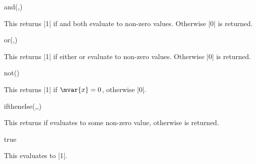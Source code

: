 \begin{math-function}{and(,)}
\mathcommand

	This returns |1| if  and  both evaluate to
	non-zero values. Otherwise |0| is returned.
	
\begin{codeexample}[]
 \pgfmathresult
\end{codeexample}

\end{math-function}

\begin{math-function}{or(,)}
\mathcommand

	This returns |1| if either  or  evaluate to
	non-zero values. Otherwise |0| is returned.
	
\begin{codeexample}[]
 \pgfmathresult
\end{codeexample}

\end{math-function}

\begin{math-function}{not()}
\mathcommand

	This returns |1| if $\mvar{x}=0$, otherwise |0|.
	
\begin{codeexample}[]
 \pgfmathresult
\end{codeexample}

\end{math-function}


\begin{math-function}{ifthenelse(,,)}
\mathcommand

	This returns  if  evaluates to some non-zero value,
	otherwise  is returned.
	
\begin{codeexample}[]
 \pgfmathresult
\end{codeexample}

\end{math-function}

\begin{math-function}{true}
\mathcommand

	This evaluates to |1|.
	
\begin{codeexample}[]
 \pgfmathresult
\end{codeexample}

\end{math-function}

